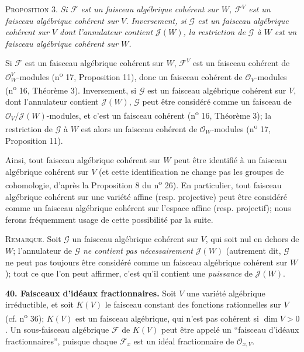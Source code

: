 \textsc{Proposition} 3. \textit{Si $\mathcal{F}$ est un faisceau algébrique cohérent sur $W$, $\mathcal{F}^V$ est un faisceau algébrique cohérent sur $V$. Inversement, si $\mathcal{G}$ est un faisceau algébrique cohérent sur $V$ dont l'annulateur contient $\mathcal{J}(W)$, la restriction de $\mathcal{G}$ à $W$ est un faisceau algébrique cohérent sur $W$.}

Si $\mathcal{F}$ est un faisceau algébrique cohérent sur $W$, $\mathcal{F}^V$ est un faisceau cohérent de $\mathcal{O}_W^V$-modules (n\textsuperscript{o} 17, Proposition 11), donc un faisceau cohérent de $\mathcal{O}_V$-modules (n\textsuperscript{o} 16, Théorème 3). Inversement, si $\mathcal{G}$ est un faisceau algébrique cohérent sur $V$, dont l'annulateur contient $\mathcal{J}(W)$, $\mathcal{G}$ peut être considéré comme un faisceau de $\mathcal{O}_V/\mathcal{J}(W)$-modules, et c'est un faisceau cohérent (n\textsuperscript{o} 16, Théorème 3); la restriction de $\mathcal{G}$ à $W$ est alors un faisceau cohérent de $\mathcal{O}_W$-modules (n\textsuperscript{o} 17, Proposition 11).

Ainsi, tout faisceau algébrique cohérent sur $W$ peut être identifié à un faisceau algébrique cohérent sur $V$ (et cette identification ne change pas les groupes de cohomologie, d'après la Proposition 8 du n\textsuperscript{o} 26). En particulier, tout faisceau algébrique cohérent sur une variété affine (resp. projective) peut être considéré comme un faisceau algébrique cohérent sur l'espace affine (resp. projectif); nous ferons fréquemment usage de cette possibilité par la suite.

\textsc{Remarque}. Soit $\mathcal{G}$ un faisceau algébrique cohérent sur $V$, qui soit nul en dehors de $W$; l'annulateur de $\mathcal{G}$ \textit{ne contient pas nécessairement} $\mathcal{J}(W)$ (autrement dit, $\mathcal{G}$ ne peut pas toujours être considéré comme un faisceau algébrique cohérent sur $W$); tout ce que l'on peut affirmer, c'est qu'il contient une \textit{puissance} de $\mathcal{J}(W)$.

\textbf{40. Faisceaux d'idéaux fractionnaires.} Soit $V$ une variété algébrique irréductible, et soit $K(V)$ le faisceau constant des fonctions rationnelles sur $V$ (cf. n\textsuperscript{o} 36); $K(V)$ est un faisceau algébrique, qui n'est pas cohérent si $\dim V > 0$. Un sous-faisceau algébrique $\mathcal{F}$ de $K(V)$ peut être appelé un ``faisceau d'idéaux fractionnaires'', puisque chaque $\mathcal{F}_x$ est un idéal fractionnaire de $\mathcal{O}_{x,V}$.

